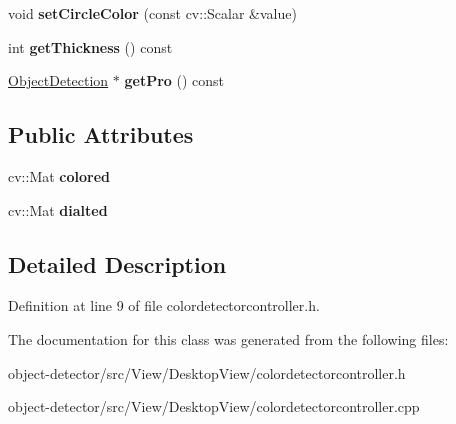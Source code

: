 \begin{DoxyCompactItemize}
\mbox{\label{class_color_detector_controller_ac6be48086945d05c1eda3a02b24fd2a9}} 
void {\bfseries set\+Circle\+Color} (const cv\+::\+Scalar \&value)
\item 
\mbox{\label{class_color_detector_controller_a0ca740b6e9e02ad320231c613763f286}} 
int {\bfseries get\+Thickness} () const
\item 
\mbox{\label{class_color_detector_controller_ad1034500aeab80949a9763e9379664db}} 
\hyperlink{class_image_processor_1_1_object_detection}{Object\+Detection} $\ast$ {\bfseries get\+Pro} () const
\end{DoxyCompactItemize}
\subsection*{Public Attributes}
\begin{DoxyCompactItemize}
\item 
\mbox{\label{class_color_detector_controller_a639034f23f3b7beeaf7001a4a8d5ffd0}} 
cv\+::\+Mat {\bfseries colored}
\item 
\mbox{\label{class_color_detector_controller_ab5ae6d433e9192bd1cbd2bb6e95cf675}} 
cv\+::\+Mat {\bfseries dialted}
\end{DoxyCompactItemize}


\subsection{Detailed Description}


Definition at line 9 of file colordetectorcontroller.\+h.



The documentation for this class was generated from the following files\+:\begin{DoxyCompactItemize}
\item 
object-\/detector/src/\+View/\+Desktop\+View/colordetectorcontroller.\+h\item 
object-\/detector/src/\+View/\+Desktop\+View/colordetectorcontroller.\+cpp\end{DoxyCompactItemize}
